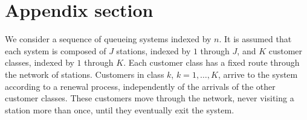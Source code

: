 \documentclass[pdftex,twocolumn,epjc3]{svjour3}          %
\begin{document}
\appendix

\section{Appendix section}\label{app}

We consider a sequence of queueing systems
indexed by $n$.  It is assumed that each system
is composed of $J$ stations, indexed by $1$
through $J$, and $K$ customer classes, indexed
by $1$ through $K$.  Each customer class
has a fixed route through the network of
stations.  Customers in class
$k$, $k=1,\ldots,K$, arrive to the
system according to a
renewal process, independently of the arrivals
of the other customer classes.  These customers
move through the network, never visiting a station
more than once, until they eventually exit
the system.


\end{document}
